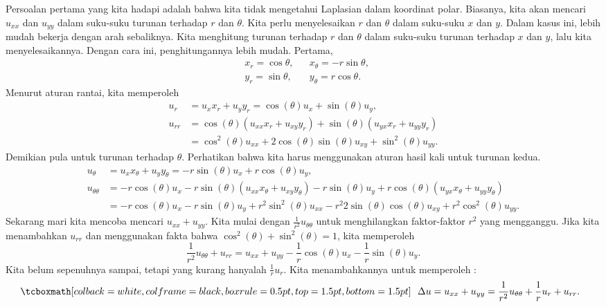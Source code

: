 Persoalan pertama yang kita hadapi adalah bahwa kita tidak mengetahui Laplasian
dalam koordinat polar.
Biasanya, kita akan mencari $u_{xx}$ dan $u_{yy}$ dalam suku-suku
turunan terhadap $r$ dan $\theta$.  Kita perlu menyelesaikan
$r$ dan $\theta$ dalam suku-suku $x$ dan $y$.  Dalam kasus ini,
lebih mudah bekerja dengan
arah sebaliknya.  Kita menghitung turunan terhadap $r$ dan $\theta$ dalam suku-suku
turunan terhadap $x$ dan $y$, lalu kita menyelesaikannya.  Dengan cara ini,
penghitungannya lebih mudah.  Pertama,
\begin{equation*}
\begin{aligned}
& x_r = \cos \theta, & &
x_\theta = - r \sin \theta, \\
& y_r = \sin \theta, & &
y_\theta = r \cos \theta.
\end{aligned}
\end{equation*}
Menurut aturan rantai, kita memperoleh
\begin{align*}
u_r & = u_x x_r + u_y y_r = \cos(\theta) u_x + \sin(\theta) u_y ,
\\
u_{rr} & =
\cos(\theta) ( u_{xx} x_r +u_{xy} y_r )
+ \sin(\theta) ( u_{yx} x_r +u_{yy} y_r )
\\
&
=
\cos^2(\theta) u_{xx} +
2 \cos(\theta)\sin(\theta) u_{xy} +
\sin^2(\theta) u_{yy} .
\end{align*}
Demikian pula untuk turunan terhadap $\theta$.  Perhatikan bahwa kita harus menggunakan
aturan hasil kali untuk turunan kedua.
\begin{align*}
u_\theta & = u_x x_\theta + u_y y_\theta =
-r\sin(\theta) u_x + r\cos(\theta) u_y ,
\\
u_{\theta\theta} & =
-r\cos(\theta) u_x
-r\sin(\theta) (u_{xx} x_\theta + u_{xy} y_\theta)
-r\sin(\theta) u_y
+
r\cos(\theta) (u_{yx} x_\theta + u_{yy} y_\theta)
\\
& = 
-r\cos(\theta) u_x
-r\sin(\theta) u_y
+r^2 \sin^2(\theta) u_{xx}
-r^2 2\sin(\theta)\cos(\theta) u_{xy}
+r^2 \cos^2(\theta) u_{yy} .
\end{align*}
Sekarang mari kita mencoba mencari $u_{xx} + u_{yy}$.  Kita mulai dengan
$\frac{1}{r^2} u_{\theta\theta}$ untuk menghilangkan faktor-faktor $r^2$ yang mengganggu.
Jika kita menambahkan $u_{rr}$
dan menggunakan fakta bahwa $\cos^2(\theta) +\sin^2(\theta) = 1$, kita memperoleh
\begin{equation*}
\frac{1}{r^2} u_{\theta\theta}
+
u_{rr}
=
u_{xx} + u_{yy} - \frac{1}{r} \cos(\theta) u_x - \frac{1}{r} \sin(\theta)
u_y .
\end{equation*}
Kita belum sepenuhnya sampai, tetapi yang kurang hanyalah 
$\frac{1}{r} u_r$.  Kita menambahkannya untuk memperoleh
\emph{}:
\begin{equation*}
\mybxbg{~~
\Delta u 
=
u_{xx} + u_{yy} =
\frac{1}{r^2} u_{\theta\theta}
+
\frac{1}{r} u_{r}
+
u_{rr} .
~~}
\end{equation*}

